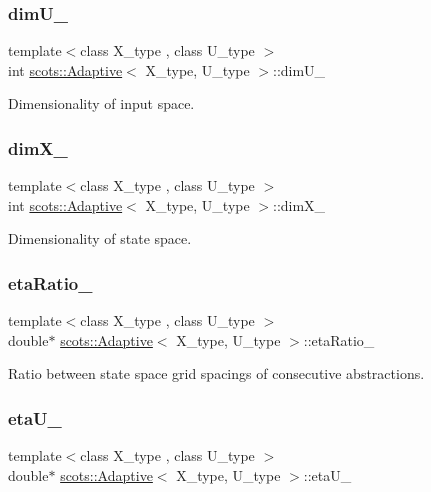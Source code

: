 \subsubsection{\texorpdfstring{dim\+U\+\_\+}{dimU\_}}
{\footnotesize\ttfamily template$<$class X\+\_\+type , class U\+\_\+type $>$ \\
int \hyperlink{classscots_1_1Adaptive}{scots\+::\+Adaptive}$<$ X\+\_\+type, U\+\_\+type $>$\+::dim\+U\+\_\+}

Dimensionality of input space. \mbox{\label{classscots_1_1Adaptive_a852e87d359ae3c0fe13493bac80f35f6}} 
\subsubsection{\texorpdfstring{dim\+X\+\_\+}{dimX\_}}
{\footnotesize\ttfamily template$<$class X\+\_\+type , class U\+\_\+type $>$ \\
int \hyperlink{classscots_1_1Adaptive}{scots\+::\+Adaptive}$<$ X\+\_\+type, U\+\_\+type $>$\+::dim\+X\+\_\+}

Dimensionality of state space. \mbox{\label{classscots_1_1Adaptive_af0ae9692bf76a9d38cca670e9535310f}} 
\subsubsection{\texorpdfstring{eta\+Ratio\+\_\+}{etaRatio\_}}
{\footnotesize\ttfamily template$<$class X\+\_\+type , class U\+\_\+type $>$ \\
double$\ast$ \hyperlink{classscots_1_1Adaptive}{scots\+::\+Adaptive}$<$ X\+\_\+type, U\+\_\+type $>$\+::eta\+Ratio\+\_\+}

Ratio between state space grid spacings of consecutive abstractions. \mbox{\label{classscots_1_1Adaptive_acc2e430a31aa9ceb8ab6593a9eb3e91f}} 
\subsubsection{\texorpdfstring{eta\+U\+\_\+}{etaU\_}}
{\footnotesize\ttfamily template$<$class X\+\_\+type , class U\+\_\+type $>$ \\
double$\ast$ \hyperlink{classscots_1_1Adaptive}{scots\+::\+Adaptive}$<$ X\+\_\+type, U\+\_\+type $>$\+::eta\+U\+\_\+}

